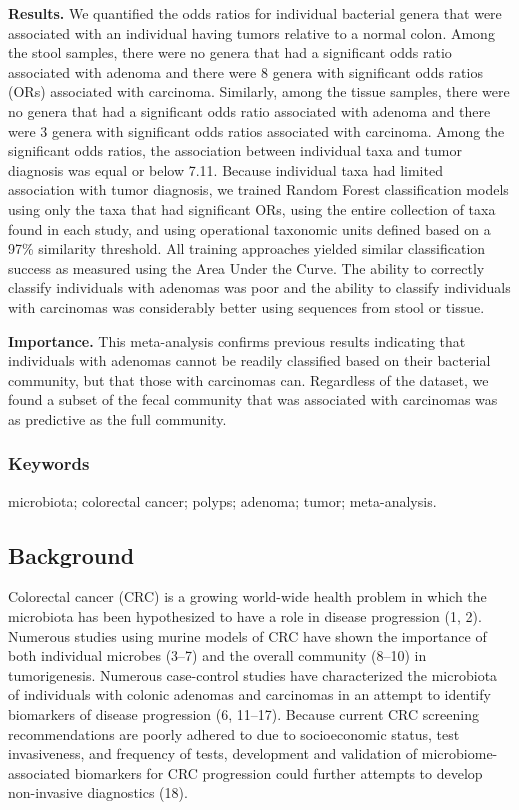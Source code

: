 \documentclass[12pt,]{article}
\begin{document}
\textbf{Results.} We quantified the odds ratios for individual bacterial
genera that were associated with an individual having tumors relative to
a normal colon. Among the stool samples, there were no genera that had a
significant odds ratio associated with adenoma and there were 8 genera
with significant odds ratios (ORs) associated with carcinoma. Similarly,
among the tissue samples, there were no genera that had a significant
odds ratio associated with adenoma and there were 3 genera with
significant odds ratios associated with carcinoma. Among the significant
odds ratios, the association between individual taxa and tumor diagnosis
was equal or below 7.11. Because individual taxa had limited association
with tumor diagnosis, we trained Random Forest classification models
using only the taxa that had significant ORs, using the entire
collection of taxa found in each study, and using operational taxonomic
units defined based on a 97\% similarity threshold. All training
approaches yielded similar classification success as measured using the
Area Under the Curve. The ability to correctly classify individuals with
adenomas was poor and the ability to classify individuals with
carcinomas was considerably better using sequences from stool or tissue.

\newpage

\textbf{Importance.} This meta-analysis confirms previous results
indicating that individuals with adenomas cannot be readily classified
based on their bacterial community, but that those with carcinomas can.
Regardless of the dataset, we found a subset of the fecal community that
was associated with carcinomas was as predictive as the full community.

\subsubsection{Keywords}\label{keywords}

microbiota; colorectal cancer; polyps; adenoma; tumor; meta-analysis.

\newpage

\subsection{Background}\label{background}

Colorectal cancer (CRC) is a growing world-wide health problem in which
the microbiota has been hypothesized to have a role in disease
progression (1, 2). Numerous studies using murine models of CRC have
shown the importance of both individual microbes (3--7) and the overall
community (8--10) in tumorigenesis. Numerous case-control studies have
characterized the microbiota of individuals with colonic adenomas and
carcinomas in an attempt to identify biomarkers of disease progression
(6, 11--17). Because current CRC screening recommendations are poorly
adhered to due to socioeconomic status, test invasiveness, and frequency
of tests, development and validation of microbiome-associated biomarkers
for CRC progression could further attempts to develop non-invasive
diagnostics (18).
\end{document}

